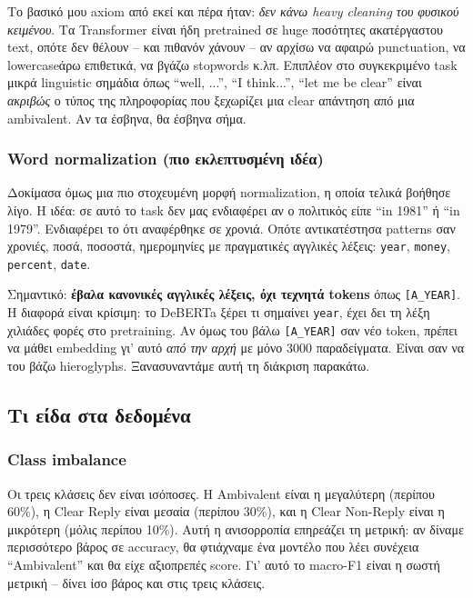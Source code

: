 \documentclass[12pt]{fphw}
\begin{document}
Το βασικό μου axiom από εκεί και πέρα ήταν: \emph{δεν κάνω heavy cleaning του φυσικού κειμένου}. Τα Transformer είναι ήδη pretrained σε huge ποσότητες ακατέργαστου text, οπότε δεν θέλουν -- και πιθανόν χάνουν -- αν αρχίσω να αφαιρώ punctuation, να lowercaseάρω επιθετικά, να βγάζω stopwords κ.λπ. Επιπλέον στο συγκεκριμένο task μικρά linguistic σημάδια όπως ``well, ...'', ``I think...'', ``let me be clear'' είναι \emph{ακριβώς} ο τύπος της πληροφορίας που ξεχωρίζει μια clear απάντηση από μια ambivalent. Αν τα έσβηνα, θα έσβηνα σήμα.

\subsubsection{Word normalization (πιο εκλεπτυσμένη ιδέα)}

Δοκίμασα όμως μια πιο στοχευμένη μορφή normalization, η οποία τελικά βοήθησε λίγο. Η ιδέα: σε αυτό το task δεν μας ενδιαφέρει αν ο πολιτικός είπε ``in 1981'' ή ``in 1979''. Ενδιαφέρει το ότι αναφέρθηκε σε χρονιά. Οπότε αντικατέστησα patterns σαν χρονιές, ποσά, ποσοστά, ημερομηνίες με πραγματικές αγγλικές λέξεις: \texttt{year}, \texttt{money}, \texttt{percent}, \texttt{date}.

Σημαντικό: \textbf{έβαλα κανονικές αγγλικές λέξεις, όχι τεχνητά tokens} όπως \texttt{[A\_YEAR]}. Η διαφορά είναι κρίσιμη: το DeBERTa ξέρει τι σημαίνει \texttt{year}, έχει δει τη λέξη χιλιάδες φορές στο pretraining. Αν όμως του βάλω \texttt{[A\_YEAR]} σαν νέο token, πρέπει να μάθει embedding γι' αυτό \emph{από την αρχή} με μόνο 3000 παραδείγματα. Είναι σαν να του βάζω hieroglyphs. Ξανασυναντάμε αυτή τη διάκριση παρακάτω.

\subsection{Τι είδα στα δεδομένα}

\subsubsection{Class imbalance}

Οι τρεις κλάσεις δεν είναι ισόποσες. Η Ambivalent είναι η μεγαλύτερη (περίπου 60\%), η Clear Reply είναι μεσαία (περίπου 30\%), και η Clear Non-Reply είναι η μικρότερη (μόλις περίπου 10\%). Αυτή η ανισορροπία επηρεάζει τη μετρική: αν δίναμε περισσότερο βάρος σε accuracy, θα φτιάχναμε ένα μοντέλο που λέει συνέχεια ``Ambivalent'' και θα είχε αξιοπρεπές score. Γι' αυτό το macro-F1 είναι η σωστή μετρική -- δίνει ίσο βάρος και στις τρεις κλάσεις.
\end{document}
